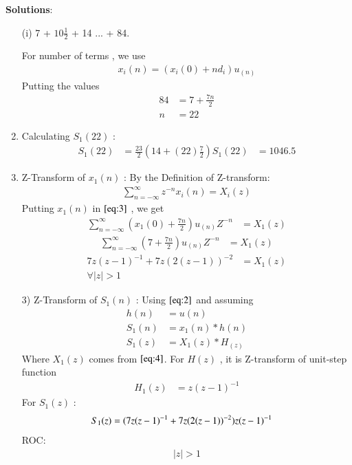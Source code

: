 \documentclass[journal,12pt,twocolumn]{IEEEtran}
\theoremstyle{remark}
\begin{document}
\vspace{0.5cm}
\textbf{Solutions}:
\begin{enumerate}
\item[(i)]   
7 + $10\frac{1}{2}$ + 14 ... + 84.

\vspace{0.15cm}
For number of terms , we use
\begin{align}
x_i(n) = (x_i(0) + nd_i)u_{(n)}\label{eq:2}
\end{align}
Putting the values
\begin{align}  
84 &= 7+\frac{7n}{2}\\
n &= 22
\end{align}
\item 
Calculating $S_1(22)$ : 
\begin{align}
    S_1{(22)} &= \frac{23}{2}(14+(22)\frac{7}{2})
    S_1{(22)} &= 1046.5
    \end{align} 

\vspace{0.1cm}
\item 
Z-Transform of $x_1(n)$ :
\vspace{0.2cm}
By the Definition of Z-transform:
\begin{align}
 \sum_{n=-\infty}^{\infty} z^{-n}x_i(n) = X_i(z)\label{eq:3}
 \end{align}
\vspace{0.05cm}Putting $x_1(n)$ in $\eqref{eq:3}$ , we get \vspace{0.05cm}
\begin{align}
     \sum_{n=-\infty}^{\infty}(x_1(0) + \frac{7n}{2})u_{(n)}Z^{-n} &= X_1(z)
\end{align}
\begin{align}
\sum_{n=-\infty}^{\infty}(7 + \frac{7n}{2})u_{(n)}Z^{-n} &= X_1(z)
\end{align}
\begin{align}
7z(z-1)^{-1} + 7z(2(z-1))^{-2} &= X_1(z) \label{eq:4}\\
\forall \lvert z \rvert  >  1 
\end{align}
\vspace{4cm}
\item[3)]
Z-Transform of $S_1(n)$ :
Using $\eqref{eq:2}$ and assuming 
\begin{align}
         h(n) &= u(n) \\
    S_1(n) &= x_1(n) * h(n) \\
    S_1(z) &= X_1(z) * H_(z)
    \end{align}
    Where $X_1(z)$ comes from $\eqref{eq:4}$.
    \vspace{0.05cm}
    For $H(z)$ , it is Z-transform of unit-step function
    \begin{align}
        H_1(z) &= z(z-1)^{-1} \label{eq:9}
    \end{align}
    For $S_1(z)$ :
    \begin{align}
S_1(z) &= \notag(7z(z-1)^{-1}+
7z(2(z-1))^{-2})z(z-1)^{-1}
    \end{align}
    ROC:
    \begin{align} 
    \lvert z \rvert > 1
    \end{align}
    

\end{enumerate}
\end{document}
